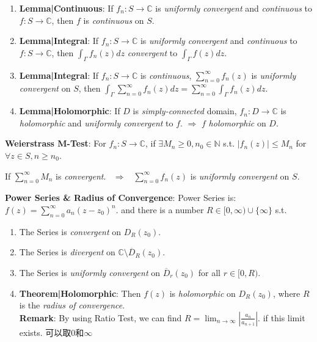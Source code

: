 \documentclass[9pt]{article}
\begin{document}
\begin{enumerate}[itemsep=-2pt, topsep=-2pt]
    \item \textbf{Lemma|Continuous}: If $f_n:S\to\mathbb{C}$ is \textit{uniformly convergent} and \textit{continuous} to $f:S\to\mathbb{C}$, then $f$ is \textit{continuous} on $S$.
    \item \textbf{Lemma|Integral}: If $f_n:S\to\mathbb{C}$ is \textit{uniformly convergent} and \textit{continuous} to $f:S\to\mathbb{C}$, then $\int_{\Gamma}f_n(z)dz$ \textit{convergent} to $\int_{\Gamma}f(z)dz$.
    \item \textbf{Lemma|Integral}: If $f_n:S\to\mathbb{C}$ is \textit{continuous}, $\sum^\infty_{n=0}f_n(z)$ is \textit{uniformly convergent} on $S$, then $\int_{\Gamma}\sum^\infty_{n=0}f_n(z)dz=\sum^\infty_{n=0}\int_{\Gamma}f_n(z)dz$.
    \item \textbf{Lemma|Holomorphic}: {\small If $D$ is \textit{simply-connected} domain, $f_n:D\to\mathbb{C}$ is \textit{holomorphic} and \textit{uniformly convergent} to $f$. $\Rightarrow$ $f$ \textit{holomorphic} on $D$.}
\end{enumerate}

\textbf{Weierstrass M-Test}: For $f_n:S\to\mathbb{C}$, if $\exists M_n\geq 0,n_0\in\mathbb{N}$ s.t. $|f_n(z)|\leq M_n$ for $\forall z\in S,n\geq n_0$. 

\hspace{156pt}If $\sum^\infty_{n=0}M_n$ is \textit{convergent}. \ $\Rightarrow$ \ $\sum^\infty_{n=0}f_n(z)$ is \textit{uniformly convergent} on $S$.

\textbf{Power Series \& Radius of Convergence}: Power Series is: $f(z)=\sum^\infty_{n=0}a_n(z-z_0)^n$. \quad and there is a number $R\in[0,\infty)\cup\{\infty\}$ s.t.

\begin{enumerate}[itemsep=-2pt, topsep=-2pt]
    \item The Series is \textit{convergent} on $D_{R}(z_0)$.
    \item The Series is \textit{divergent} on $\mathbb{C}\setminus \overline{D}_{R}(z_0)$.
    \item The Series is \textit{uniformly convergent} on $\overline{D}_{r}(z_0)$ for all $r\in[0,R)$.
    \item \textbf{Theorem|Holomorphic}: Then $f(z)$ is \textit{holomorphic} on $D_{R}(z_0)$, where $R$ is the \textit{radius of convergence}. \\
    \textbf{Remark}: By using Ratio Test, we can find $R=\lim_{n\to\infty}\left|\frac{a_n}{a_{n+1}}\right|$. {\scriptsize if this limit exists. 可以取0和$\infty$}
\end{enumerate}
\end{document}
